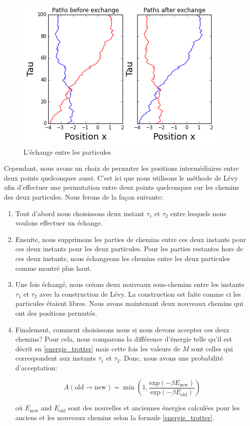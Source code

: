 \documentclass[11pt]{article}
\theoremstyle{definition}
\theoremstyle{remark}
\begin{document}
\begin{figure}[!h]
\label{levy_paths_exchange}
\centering 
\includegraphics{levy_paths_2.png}
\caption{L'échange entre les particules} 
\end{figure} 

Cependant, nous avons un choix de permuter les positions intermédiaires entre deux points quelconques aussi. C'est ici que nous utilisons le méthode de Lévy afin d’effectuer une permutation entre deux points quelconques sur les chemins des deux particules. Nous ferons de la façon suivante: 

\begin{enumerate} 
\item 
Tout d'abord nous choisissons deux instant $\tau_1$ et $\tau_2$ entre lesquels nous voulons effectuer un échange. 
\item 
Ensuite, nous supprimons les parties de chemins entre ces deux instants pour ces deux instants pour les deux particules. Pour les parties restantes hors de ces deux instants, nous échangeons les chemins entre les deux particules comme montré plus haut. 
\item 
Une fois échangé, nous créons deux nouveaux sous-chemins entre les instants $\tau_1$ et $\tau_2$ avec la construction de Lévy. La construction est faite comme ci les particules étaient libres. Nous avons maintenant deux nouveaux chemins qui ont des positions permutés. 
\item 
Finalement, comment choisissons nous si nous devons accepter ces deux chemins? Pour cela, nous comparons la différence d'énergie telle qu'il est décrit en \eqref{energie_trotter} mais cette fois les valeurs de $M$ sont celles qui correspondent aux instants $\tau_1$ et $\tau_2$. Donc, nous avons une probabilité d'acceptation: 

\begin{equation}
\label{acceptance_levy} 
A(\mathrm{old}\rightarrow \mathrm{new}) = \min\left(1,\frac{\mathrm{exp}(-\beta E_{\mathrm{new}})}{\mathrm{exp}(-\beta E_{\mathrm{old}})}\right)
\end{equation}

où $E_\mathrm{new}$ and $E_\mathrm{old}$ sont des nouvelles et anciennes énergies calculées pour les anciens et les nouveaux chemins selon la formule \eqref{energie_trotter}. 
\end{enumerate}
\end{document}
